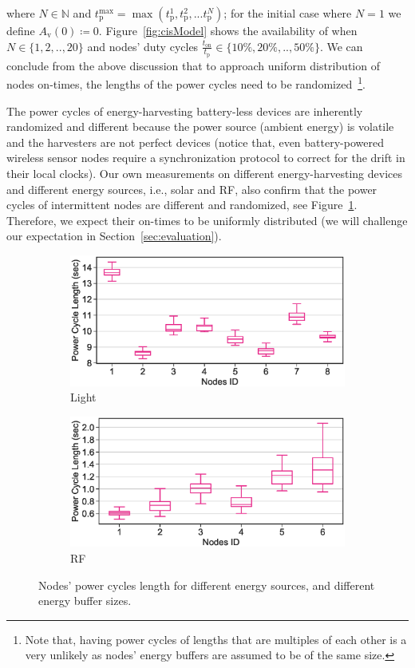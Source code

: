 where $N \in \mathbb{N}$ and $t_\text{p}^\text{max} = \max\left({ t_\text{p}^1,t_\text{p}^2,\text{...} t_\text{p}^N } \right)$; for the initial case where $N=1$ we define $A_\text{v}(0)\coloneqq 0$. Figure~\ref{fig:cisModel} shows the availability of \sys when $N\in\{1,2,..,20\}$ and nodes' duty cycles $\frac{t_\text{on}}{t_\text{p}}\in\{10\%,20\%,..,50\%\}$.
%
We can conclude from the above discussion that to approach uniform distribution of nodes on-times, the lengths of the power cycles need to be randomized~\footnote{Note that, having power cycles of lengths that are multiples of each other is a very unlikely as nodes' energy buffers are assumed to be of the same size.}. 

The power cycles of energy-harvesting battery-less devices are inherently randomized and different because the power source (ambient energy) is volatile and the harvesters are not perfect devices (notice that, even battery-powered wireless sensor nodes require a synchronization protocol to correct for the drift in their local clocks). Our own measurements on different energy-harvesting devices and different energy sources, i.e., solar and RF, also confirm that the power cycles of intermittent nodes are different and randomized, see Figure~\ref{fig:power_cycles}. Therefore, we expect their on-times to be uniformly distributed (we will challenge our expectation in Section~\ref{sec:evaluation}). 
%
\begin{figure}[t]
		\begin{subfigure}{.49\columnwidth}
			\centering
			\includegraphics[width=\textwidth]{figures/light_power_cycles_len}
			\caption{Light}
		\end{subfigure}\hfill
		\begin{subfigure}{.49\columnwidth}
			\centering
			\includegraphics[width=\textwidth]{figures/rf_power_cycles_len}
			\caption{RF}
		\end{subfigure}\hfill
		\caption{Nodes' power cycles length for different energy sources, and different energy buffer sizes.}
		\label{fig:power_cycles}
\end{figure} 
%
